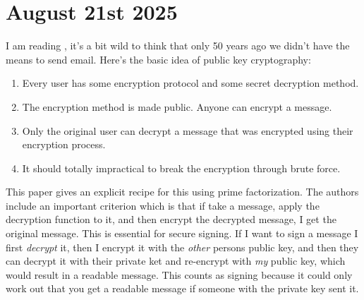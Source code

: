 \documentclass{amsart}
\theoremstyle{definition}
\begin{document}
\section{August 21st 2025}
I am reading \cite{RSA}, it's a bit wild to think that only 50 years ago we didn't have the means to send email. Here's the basic idea of public key cryptography:
\begin{enumerate}
    \item Every user has some encryption protocol and some secret decryption method.
    \item The encryption method is made public. Anyone can encrypt a message.
    \item Only the original user can decrypt a message that was encrypted using their encryption process.
    \item It should totally impractical to break the encryption through brute force.
\end{enumerate}
This paper gives an explicit recipe for this using prime factorization. The authors include an important criterion which is that if take a message, apply the decryption function to it, and then encrypt the decrypted message, I get the original message. This is essential for secure signing. If I want to sign a message I first \textit{decrypt} it, then I encrypt it with the \textit{other} persons public key, and then they can decrypt it with their private ket and re-encrypt with \textit{my} public key, which would result in a readable message. This counts as signing because it could only work out that you get a readable message if someone with the private key sent it.
\end{document}

